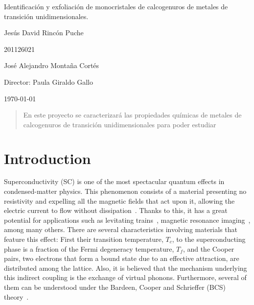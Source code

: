 \documentclass{article}
\begin{document}
\begin{center}
\Huge
Identificación y exfoliación de monocristales de calcogenuros de metales de transición unidimensionales.

\vspace{3mm}
\Large Jesús David Rincón Puche

\large
201126021

\Large José Alejandro Montaña Cortés
\large 


\vspace{2mm}
\Large
Director: Paula Giraldo Gallo\\


\normalsize
\vspace{2mm}

\today
\end{center}

\begin{abstract}
 En este proyecto se caracterizará las propiedades químicas de metales de calcogenuros de transición unidimensionales para poder estudiar 
\end{abstract}

\normalsize
\section{Introduction}

Superconductivity (SC) is one of the most spectacular quantum effects in condensed-matter physics. This phenomenon consists of a material presenting no resistivity and expelling all the magnetic fields that act upon it, allowing the electric current to flow without dissipation~\cite{Leggett}. Thanks to this, it has a great potential for applications such as levitating trains~\cite{Trains}, magnetic resonance imaging~\cite{Resonance}, among many others. There are several characteristics involving 
materials that feature this effect: First their transition temperature, $T_c$, to the superconducting phase is a fraction of the Fermi degeneracy temperature, $T_f$, and the Cooper pairs, two electrons that form a bound state due to an effective attraction, are distributed among the lattice. Also, it is believed that the mechanism underlying this indirect coupling is the exchange of virtual phonons. Furthermore, several of them can be understood under the Bardeen, Cooper and Schrieffer (BCS) theory~\cite{PhysRev.108.1175}.
\end{document}
